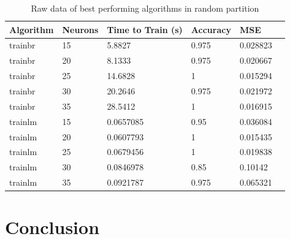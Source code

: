 \documentclass[a4paper, 10pt, conference]{ieeeconf}
\begin{document}
\begin{table}
\centering
\caption{Raw data of best performing algorithms in random partition}
\label{tbl:mixed}
\begin{tabular}{llllll}
\hline
\textbf{Algorithm} & \textbf{Neurons} & \textbf{Time to Train (s)} & \textbf{Accuracy} & \textbf{MSE} \\ \hline
trainbr & 15 & 5.8827 & 0.975 & 0.028823 \\ \hline 
trainbr & 20 & 8.1333 & 0.975 & 0.020667 \\ \hline 
trainbr & 25 & 14.6828 & 1 & 0.015294 \\ \hline 
trainbr & 30 & 20.2646 & 0.975 & 0.021972 \\ \hline 
trainbr & 35 & 28.5412 & 1 & 0.016915 \\ \hline 

trainlm & 15 & 0.0657085 & 0.95 & 0.036084 \\ \hline 
trainlm & 20 & 0.0607793 & 1 & 0.015435 \\ \hline 
trainlm & 25 & 0.0679456 & 1 & 0.019838 \\ \hline 
trainlm & 30 & 0.0846978 & 0.85 & 0.10142 \\ \hline 
trainlm & 35 & 0.0921787 & 0.975 & 0.065321 \\ \hline 
\end{tabular}
\end{table}





\section{Conclusion}
\end{document}
